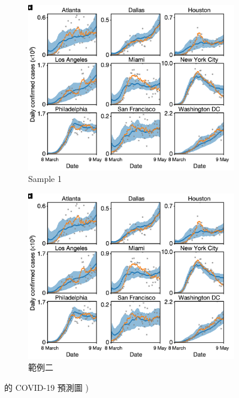 \documentclass[12pt, a4paper]{article}
\begin{document}
\begin{figure}[htb]
    \centering 
    
    \begin{subfigure}[b]{0.4\textwidth}
        \includegraphics[width=\textwidth]{fig/sample.png}
         \caption{Sample 1}
         \label{fig:pred-cities}
    \end{subfigure} 
    \begin{subfigure}[b]{0.4\textwidth}
        \includegraphics[width=\textwidth]{fig/sample.png}
        \caption{範例二}
        \label{fig:pred-compare}
    \end{subfigure}
    
    \caption{\citeauthor{mobility2020} 的 COVID-19 預測圖 \cite{mobility2020}) }
    \label{fig:pred}
\end{figure}
\end{document}
